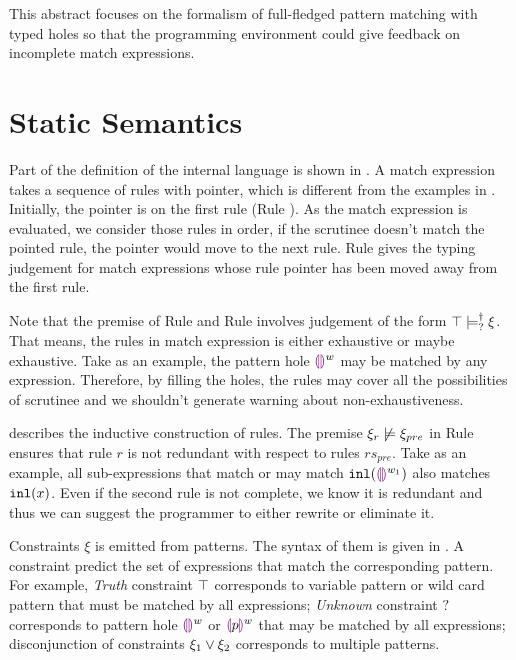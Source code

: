 \documentclass[acmsmall,screen,review,nonacm]{acmart}
\theoremstyle{slplain}
\numberwithin{thm}{section}
\begin{document}
This abstract focuses on the formalism of full-fledged pattern matching with typed holes so that the programming environment could give feedback on incomplete match expressions.

\section{Static Semantics}
\label{sec:statics}



Part of the definition of the internal language is shown in . A match expression takes a sequence of rules with pointer, which is different from the examples in . Initially, the pointer is on the first rule (Rule \TMatchZPre). As the match expression is evaluated, we consider those rules in order, if the scrutinee doesn't match the pointed rule, the pointer would move to the next rule. Rule \TMatchNZPre gives the typing judgement for match expressions whose rule pointer has been moved away from the first rule.

Note that the premise of Rule \TMatchZPre and Rule \TMatchNZPre involves judgement of the form $\top \models_{?}^{\dag} \xi$. That means, the rules in match expression is either exhaustive or maybe exhaustive.
Take  as an example, the pattern hole $\textcolor{violet}{\llparenthesis}\textcolor{violet}{\rrparenthesis}^{w}$ may be matched by any expression. Therefore, by filling the holes, the rules may cover all the possibilities of scrutinee and we shouldn't generate warning about non-exhaustiveness.



 describes the inductive construction of rules. The premise $\xi_r \not\models \xi_{pre}$ in Rule \TRules ensures that rule $r$ is not redundant with respect to rules $rs_{pre}$.
Take  as an example, all sub-expressions that match or may match $\mathtt{inl}(\textcolor{violet}{\llparenthesis}\textcolor{violet}{\rrparenthesis}^{w_1})$ also matches $\mathtt{inl}(x)$. Even if the second rule is not complete, we know it is redundant and thus we can suggest the programmer to either rewrite or eliminate it.



Constraints $\xi$ is emitted from patterns. The syntax of them is given in . A constraint predict the set of expressions that match the corresponding pattern.
For example, \emph{Truth} constraint $\top$ corresponds to variable pattern or wild card pattern that must be matched by all expressions;
\emph{Unknown} constraint $?$ corresponds to pattern hole $\textcolor{violet}{\llparenthesis}\textcolor{violet}{\rrparenthesis}^{w}$ or $\textcolor{violet}{\llparenthesis} p\textcolor{violet}{\rrparenthesis}^{w}$ that may be matched by all expressions;
disconjunction of constraints $\xi_1 \vee \xi_2$ corresponds to multiple patterns.
\end{document}
